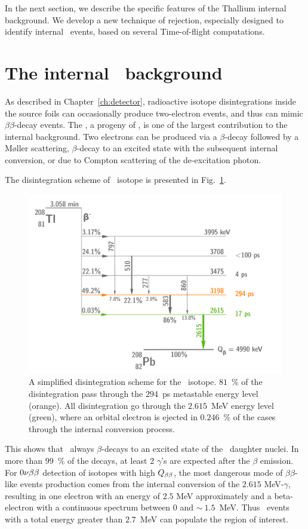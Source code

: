 In the next section, we describe the specific features of the Thallium internal background.
We develop a new technique of rejection, especially designed to identify internal \Tl\ events, based on several Time-of-flight computations.

\section{The internal \Tl\ background}

As described in Chapter~\ref{ch:detector}, radioactive isotope disintegrations inside the source foils can occasionally produce two-electron events, and thus can mimic $\beta\beta$-decay events.
The \Tl, a progeny of \Th, is one of the largest contribution to the internal background.
Two electrons can be produced via a $\beta$-decay followed by a M\o{}ller scattering, $\beta$-decay to an excited state with the subsequent internal conversion, or due to Compton scattering of the de-excitation photon.

The disintegration scheme of \Tl\ isotope is presented in Fig.~\ref{fig:Tl_scheme}.
\begin{figure}[!h]
  \centering
  \includegraphics[width=13cm]{timedifference/fig_timediff/Tl_decay_scheme.pdf}
  \caption{A simplified disintegration scheme for the \Tl\ isotope.
    $81$~\% of the disintegration pass through the $294$~ps metastable energy level (orange).
    All disintegration go through the $2.615$~MeV energy level (green), where an orbital electron is ejected in $0.246$~\% of the cases through the internal conversion process.
  \label{fig:Tl_scheme}}
\end{figure}
This shows that \Tl\ always $\beta$-decays to an excited state of the \Pb\ daughter nuclei.
In more than $99$~\% of the decays, at least 2 $\gamma$'s are expected after the $\beta$ emission.
For $0\nu\beta\beta$ detection of isotopes with high $Q_{\beta\beta}$, the most dangerous mode of $\beta\beta$-like events production comes from the internal conversion of the $2.615$ MeV-$\gamma$, resulting in one electron with an energy of $2.5$ MeV approximately and a beta-electron with a continuous spectrum between $0$ and $\sim~1.5$~MeV.
Thus \Tl\ events with a total energy greater than $2.7$~MeV can populate the region of interest.


